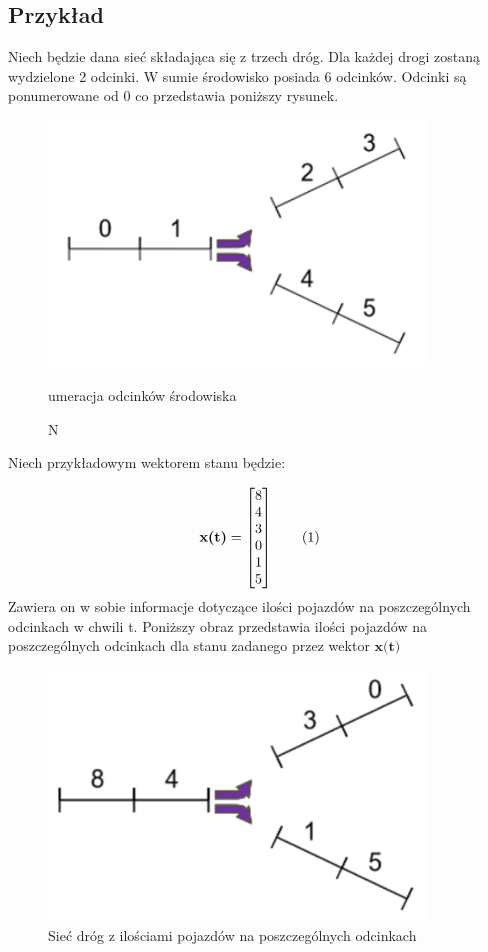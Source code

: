 \documentclass[12pt]{book}
\theoremstyle{plain}
\newcommand\addtag{\refstepcounter{equation}
\renewcommand{\labelenumii}{\theenumii}
\renewcommand{\theenumii}{\theenumi.\arabic{enumii}.}
\tag{\theequation}}
\begin{document}
\subsection{Przykład} \label{subsec:wektor_stanu_siec_przyklad}
Niech będzie dana sieć składająca się z trzech dróg. Dla każdej drogi zostaną wydzielone 2 odcinki. W sumie środowisko posiada 6 odcinków. Odcinki są ponumerowane od 0 co przedstawia poniższy rysunek.
	\begin{figure}[H]
	\centering
	\includegraphics[width=10cm]{images/env_11}
	\label{fig:env_11}
	\caption Numeracja odcinków środowiska
\end{figure}

Niech przykładowym wektorem stanu będzie:
\def \xzero {\begin{bmatrix}
		8 \\ 4 \\ 3 \\ 0 \\ 1 \\ 5
\end{bmatrix}}

\[\textbf{x(t)}=\xzero \addtag \]
Zawiera on w sobie informacje dotyczące ilości pojazdów na poszczególnych odcinkach w chwili t. Poniższy obraz przedstawia ilości pojazdów na poszczególnych odcinkach dla stanu zadanego przez wektor $\textbf{x(t)}$
\begin{figure}[H]
	\centering
	\includegraphics[width=10cm]{images/env_11_843015}
	\caption{Sieć dróg z ilościami pojazdów na poszczególnych odcinkach}
	\label{fig:3_single_road}
\end{figure}
\end{document}
